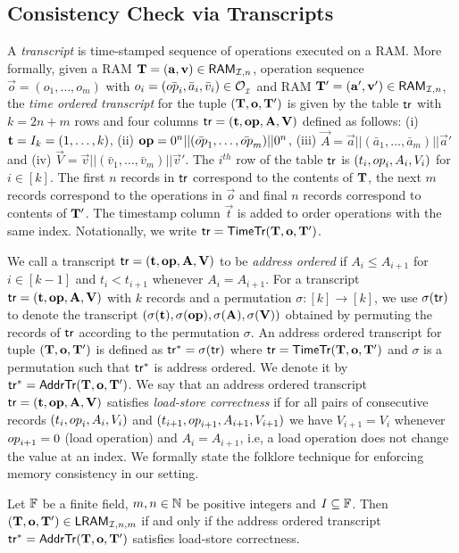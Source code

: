 \subsection{Consistency Check via Transcripts}\label{subsec:transcripts}
A {\em transcript} is time-stamped sequence of operations executed on a RAM.
More formally, given a RAM $\mathbf{T}=(\mathbf{a},\mathbf{v})\in \mathsf{RAM}_{\mathcal{I}, {n}}$,
operation sequence $\vec{o}=(o_1,\ldots,o_m)$ with $o_i=(\bar{{op}_i},\bar{a}_i,\bar{v}_i)\in \mathcal{O}_{{}_\mathcal{I}}$ and RAM $\mathbf{T}'=(\mathbf{a}', \mathbf{v}')\in \mathsf{RAM}_{\mathcal{I}, {n}}$,
the {\em time ordered transcript} for the tuple $(\mathbf{T},\mathbf{o},\mathbf{T}')$ is given by the table $\mathsf{tr}$ with $k=2n+m$ rows and four columns
$\mathsf{tr} = (\mathbf{t},\mathbf{{op}},\mathbf{A},\mathbf{V})$  defined as follows: (i) $\mathbf{t}=I_{k}=(1,\ldots,k)$,
(ii) $\mathbf{{op}}=0^n||(\bar{{op}}_1,\ldots,\bar{{op}}_m)||0^n$,
(iii) $\vec{A}=\vec{a}||(\bar{a}_1,\ldots,\bar{a}_m)||\vec{a}'$ and
(iv) $\vec{V}=\vec{v}||(\bar{v}_1,\ldots,\bar{v}_m)||\vec{v}'$. The $i^{th}$ row of the table $\mathsf{tr}$ is
$(t_i,{op}_i,A_i,V_i)$ for $i\in [k]$. The first $n$ records in $\mathsf{tr}$ correspond to the contents of $\mathbf{T}$,
the next $m$ records correspond to the operations in $\vec{o}$ and final $n$
records correspond to contents of $\mathbf{T}'$. The timestamp column $\vec{t}$ is added to order operations with the same index.
Notationally, we write $\mathsf{tr}=\mathsf{TimeTr}(\mathbf{T},\mathbf{o},\mathbf{T}')$.

We call a transcript $\mathsf{tr}=(\mathbf{t},\mathbf{{op}},\mathbf{A},\mathbf{V})$ to be {\em address ordered} if $A_i\leq A_{i+1}$ for $i\in [k-1]$ and
$t_i < t_{i+1}$ whenever $A_i=A_{i+1}$. For a transcript $\mathsf{tr}=(\mathbf{t},\mathbf{{op}},\mathbf{A},\mathbf{V})$ with $k$ records and a
permutation $\sigma:[k]\rightarrow [k]$, we use $\sigma(\mathsf{tr})$ to denote the transcript
$(\sigma(\mathbf{t}),\sigma(\mathbf{{op}}),\sigma(\mathbf{A}),\sigma(\mathbf{V}))$
obtained by permuting the records of $\mathsf{tr}$ according to the permutation $\sigma$.
An address ordered transcript for tuple $(\mathbf{T},\mathbf{o},\mathbf{T}')$ is defined as $\mathsf{tr}^\ast=\sigma(\mathsf{tr})$ where $\mathsf{tr}=\mathsf{TimeTr}(\mathbf{T},\mathbf{o},\mathbf{T}')$ and $\sigma$ is
a permutation such that $\mathsf{tr}^\ast$ is address ordered. We denote it by $\mathsf{tr}^\ast=\mathsf{AddrTr}(\mathbf{T},\mathbf{o},\mathbf{T}')$.
We say that an address ordered transcript $\mathsf{tr}=(\mathbf{t},\mathbf{{op}},\mathbf{A},\mathbf{V})$ satisfies {\em load-store correctness}
if for all pairs of consecutive records $(t_i,{op}_i,A_i,V_i)$ and $(t_{i+1},{op}_{i+1},A_{i+1},V_{i+1})$ we have $V_{i+1}=V_i$
whenever ${op}_{i+1}=0$ (load operation) and
$A_i=A_{i+1}$, i.e, a load operation does not change the value at an index.
We formally state the folklore technique for enforcing memory consistency in our setting.
\begin{lemma}\label{lem:consistency-check}
Let $\mathbb{F}$ be a finite field, $m,n\in \mathbb{N}$ be positive integers and $I\subseteq \mathbb{F}$. Then $(\mathbf{T},\mathbf{o},\mathbf{T}')\in \mathsf{LRAM}_{\mathcal{I},n,m}$ if and only if
    the address ordered transcript $\mathsf{tr}^\ast=\mathsf{AddrTr}(\mathbf{T},\mathbf{o},\mathbf{T}')$ satisfies load-store correctness.
\end{lemma}

